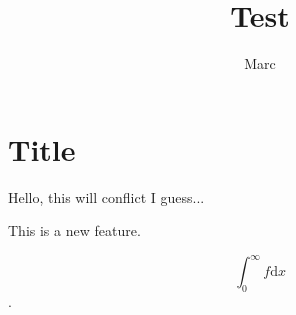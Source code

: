 \documentclass{article}
\begin{document}
\author{Marc}
\title{Test}
\maketitle

\section{Title}
\label{sec:title}
Hello, this will conflict I guess...

This is a new feature.

$$ \int_0^\infty f \mathrm{d}x $$.
\end{document}
